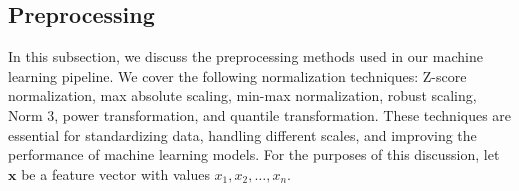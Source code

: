 \subsection{Preprocessing}
In this subsection, we discuss the preprocessing methods used in our machine learning pipeline.
We cover the following normalization techniques: Z-score normalization, max absolute scaling, min-max normalization, robust scaling, Norm 3, power transformation, and quantile transformation.
These techniques are essential for standardizing data, handling different scales, and improving the performance of machine learning models.
For the purposes of this discussion, let $\mathbf{x}$ be a feature vector with values $x_1, x_2, \ldots, x_n$.









